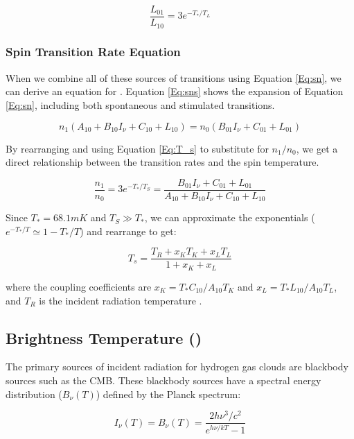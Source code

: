 \begin{equation} \label{Eq:lcoef}
\frac{L_{01}}{L_{10}} = 3 e^{-T_*/T_L}
\end{equation}

\subsubsection{Spin Transition Rate Equation}
When we combine all of these sources of transitions using Equation \ref{Eq:sn}, we can derive an equation for \ts. Equation \ref{Eq:sns} shows the expansion of Equation \ref{Eq:sn}, including both spontaneous and stimulated transitions. 

\begin{equation}\label{Eq:sns}
n_1(A_{10} + B_{10} I_\nu + C_{10} + L_{10}) = n_0 (B_{01} I_\nu + C_{01} + L_{01})
\end{equation}

By rearranging and using Equation \ref{Eq:T_s} to substitute for $n_1/n_0$, we get a direct relationship between the transition rates and the spin temperature. 

\begin{equation}
\frac{n_1}{n_0} = 3 e^{-T_*/T_S} = \frac{B_{01} I_\nu + C_{01}+ L_{01}}{A_{10}+ B_{10} I_\nu + C_{10} +L_{10}}
\end{equation}

Since $T_* = 68.1 mK$ and $T_S \gg T_*$, we can approximate the exponentials ($e^{-T_*/T} \simeq 1-T_*/T$) and rearrange to get:

\begin{equation}\label{Eq:dT_s}
T_s = \frac{T_{R} + x_K T_{K} + x_{L} T_{L}}{1+x_K +x_{L}}
\end{equation}

where the coupling coefficients are $x_K = T_* C_{10}/A_{10} T_K$ and $x_L = T_* L_{10} / A_{10} T_L$, and $T_R$ is the incident radiation temperature \cite{field_1958}.

\subsection{Brightness Temperature (\tb)}
The primary sources of incident radiation for hydrogen gas clouds are blackbody sources such as the CMB. These blackbody sources have a spectral energy distribution ($B_\nu (T)$) defined by the Planck spectrum:

\begin{equation}
I_{\nu} (T) = B_{\nu}(T) = \frac{ 2 h \nu^3 / c^2}{e^{h \nu / k T}-1}
\end{equation}


